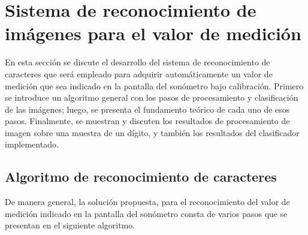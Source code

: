 
\chapter{Sistema de reconocimiento de imágenes para el valor de medición}
\label{ch:image_recognition}
En esta sección se discute el desarrollo del sistema de reconocimiento de caracteres que será empleado para adquirir automáticamente un valor de medición que sea indicado en la pantalla del sonómetro bajo calibración.
Primero se introduce un algoritmo general con los pasos de procesamiento y clasificación de las imágenes;
luego, se presenta el fundamento teórico de cada uno de esos pasos.
Finalmente, se muestran y discuten los resultados de procesamiento de imagen sobre una muestra de un dígito, y también los resultados del clasificador implementado.

\section*{Algoritmo de reconocimiento de caracteres}
De manera general, la solución propuesta, para el reconocimiento del valor de medición indicado en la pantalla del sonómetro consta de varios pasos que se presentan en el siguiente algoritmo.


